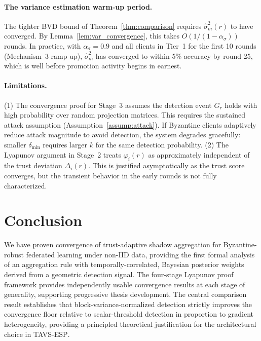 \documentclass{article}
\newcommand{\TAVESP}{\textsc{TAVS-ESP}}
\begin{document}
\paragraph{The variance estimation warm-up period.}
The tighter BVD bound of Theorem~\ref{thm:comparison} requires
$\hat\sigma_m^2(r)$ to have converged.
By Lemma~\ref{lem:var_convergence}, this takes $O(1/(1-\alpha_\sigma))$ rounds.
In practice, with $\alpha_\sigma = 0.9$ and all clients in Tier~1 for the
first 10 rounds (Mechanism~3 ramp-up), $\hat\sigma_m^2$ has converged to
within 5\% accuracy by round 25, which is well before promotion activity
begins in earnest.

\paragraph{Limitations.}
(1) The convergence proof for Stage~3 assumes the detection event $G_r$
holds with high probability over random projection matrices.
This requires the sustained attack assumption (Assumption~\ref{assump:attack}).
If Byzantine clients adaptively reduce attack magnitude to avoid detection,
the system degrades gracefully: smaller $\delta_{\min}$ requires larger $k$
for the same detection probability.
(2) The Lyapunov argument in Stage~2 treats $\varphi_i(r)$ as approximately
independent of the trust deviation $\Delta_i(r)$.
This is justified asymptotically as the trust score converges, but the
transient behavior in the early rounds is not fully characterized.

\section{Conclusion}
\label{sec:conclusion}

We have proven convergence of trust-adaptive shadow aggregation for
Byzantine-robust federated learning under non-IID data, providing the first
formal analysis of an aggregation rule with temporally-correlated, Bayesian
posterior weights derived from a geometric detection signal.
The four-stage Lyapunov proof framework provides independently usable
convergence results at each stage of generality, supporting progressive
thesis development.
The central comparison result establishes that block-variance-normalized
detection strictly improves the convergence floor relative to
scalar-threshold detection in proportion to gradient heterogeneity, providing
a principled theoretical justification for the architectural choice in
\TAVESP{}.
\end{document}
